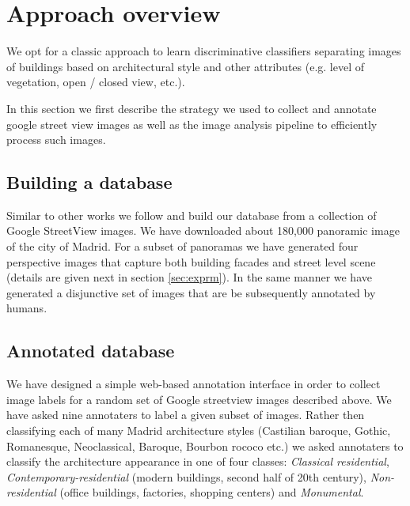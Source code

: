 \documentclass[runningheads, table]{llncs}
\begin{document}
\section{Approach overview}
We opt for a classic approach \cite{csurka04}  to learn discriminative classifiers separating images of buildings based on architectural style and other attributes (e.g. level of vegetation, open / closed view, etc.). 

In this section we first describe the strategy we used to  collect and annotate google street view images as well as the image analysis pipeline to efficiently process such images. 

\subsection{Building a database}
  \vspace{-1mm}
  Similar to other works \cite{Gronat13, Doersch} we follow \cite{Gronat11} and build our database from a collection of Google StreetView images. We have downloaded about 180,000 panoramic image of the city of Madrid. For a subset of panoramas we have generated four perspective images that capture both building facades and street level scene (details are given next in section \ref{sec:exprm}). In the same manner we have generated a disjunctive set of images that are be subsequently annotated by humans. 
  
\subsection{Annotated database} 
  \vspace{-1mm}
  We have designed a simple web-based annotation interface in order to collect image labels for a random set of Google streetview images described above. We have asked nine annotaters to label a given subset of images. Rather then  classifying each of many Madrid architecture styles (Castilian baroque, Gothic, Romanesque, Neoclassical, Baroque, Bourbon rococo etc.) we asked annotaters to classify the architecture appearance in one of four classes: \emph{Classical residential}, \emph{Contemporary-residential} (modern buildings, second half of 20th century), \emph{Non-residential} (office buildings, factories, shopping centers) and \emph{Monumental}. 
\end{document}
